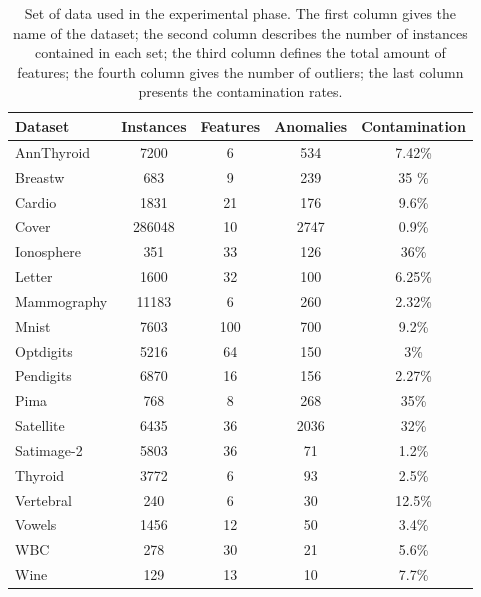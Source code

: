 \begin{table*}[]
\centering
	\begin{tabular}{@{}lccc c@{}} \hline
		\textbf{Dataset} & \textbf{Instances} & \textbf{Features} & \textbf{Anomalies}  & \textbf{Contamination}\\ \hline
		AnnThyroid   & 7200                & 6                  & 534        & 7.42\%        \\ 
		Breastw      & 683                 & 9                  & 239        & 35 \%        \\
		Cardio &	1831 & 21 & 176 & 9.6\% \\
		Cover & 286048 & 10 & 2747 & 0.9\% \\
		Ionosphere   & 351                 & 33                 & 126          &      36\%\\
		Letter & 1600 &  32 & 100 & 6.25\% \\
		Mammography  & 11183               & 6                  & 260           &  2.32\%   \\
		Mnist & 7603 & 100 & 700 & 9.2\% \\
		Optdigits	& 5216 & 64 &	150 & 3\% \\
		Pendigits    & 6870                & 16                 & 156          &  2.27\%    \\
		Pima         & 768                 & 8                  & 268          &  35\%    \\
		Satellite & 6435 & 36 & 2036  & 32\% \\
		Satimage-2	&5803&36&	71& 1.2\% \\
		Thyroid	& 3772 & 6 & 93 & 2.5\% \\
		Vertebral	&240&	6	&30 &12.5\% \\
		Vowels& 	1456&12	&50 &3.4\%   \\
		WBC	&278	&30	&21 &5.6\%   \\ 
		Wine & 129	& 13	& 10 & 7.7\% \\ \hline
		
	\end{tabular}
	\caption{Set of data used in the experimental phase. The first column gives the name of the dataset; the second column describes the number of instances contained in each set; the third column defines the total amount of features; the fourth column gives the number of outliers; the last column presents the contamination rates.}
	\label{dataset_used}
	\end{table*}